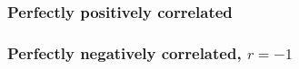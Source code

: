 \documentclass[handout]{beamer}
\begin{document}


   \begin{frame}
   \frametitle{Perfectly positively correlated}
   \begin{center}
   \end{center}

   \end{frame}



   \begin{frame}
   \frametitle{Perfectly negatively correlated, $r=-1$}
   \begin{center}
   \end{center}

   \end{frame}

\end{document}

